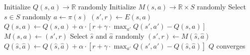 
        \begin{algorithmic}
         \State Initialize $Q(s,a) \rightarrow \mathbb{R}$ randomly
            \State Initialize $M(s,a) \rightarrow \mathbb{R}\times S$ randomly 
            \Repeat
                \State Select $s \in S$ randomly
                \State $a \gets \pi(s)$ 
                \State $(s',r) \gets E(s, a)$ 
                \State $Q(s, a) \gets  Q(s, a) + \alpha \cdot [r +
                \gamma \cdot \max_{a'} Q(s', a') - Q(s,a)]$
                \State $M(s, a) \gets (s', r)$
                    \State Select $\hat{s}$ and $\hat{a}$ randomly
                    \State $(s', r) \gets M(\hat{s}, \hat{a})$
                    \State $Q(\hat{s}, \hat{a}) \gets  Q(\hat{s}, \hat{a}) + \alpha \cdot [r + \gamma \cdot \max_{a'} Q(s', a')-Q(\hat{s},\hat{a})]$
                \EndFor
            \Until $Q$ converges
        \end{algorithmic}
